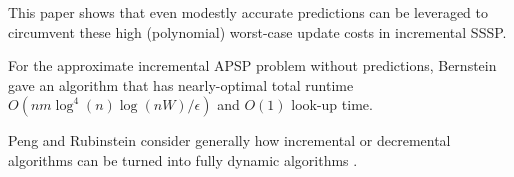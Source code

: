 This paper shows that even modestly accurate predictions can be leveraged to circumvent these high (polynomial) worst-case update costs in incremental SSSP.

For the approximate incremental APSP problem without predictions, Bernstein~\cite{bernstein2016maintaining} gave an algorithm that has nearly-optimal total runtime $O(nm \log^4 (n) \log (nW)/\epsilon)$ and $O(1)$ look-up time. 

Peng and Rubinstein consider generally how incremental or decremental algorithms can be turned into fully dynamic algorithms \cite{PengR23}.